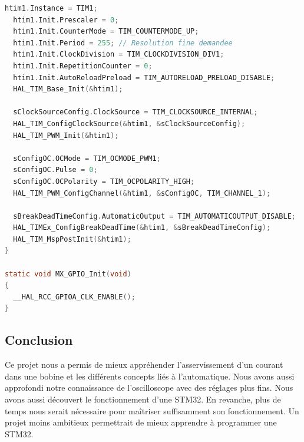 \documentclass[11pt]{report}
\begin{document}
\begin{lstlisting}[language=C, caption={fichier main.c en BO}, label={code:main_final}]
  htim1.Instance = TIM1;
  htim1.Init.Prescaler = 0;
  htim1.Init.CounterMode = TIM_COUNTERMODE_UP;
  htim1.Init.Period = 255; // Resolution fine demandee
  htim1.Init.ClockDivision = TIM_CLOCKDIVISION_DIV1;
  htim1.Init.RepetitionCounter = 0;
  htim1.Init.AutoReloadPreload = TIM_AUTORELOAD_PRELOAD_DISABLE;
  HAL_TIM_Base_Init(&htim1);

  sClockSourceConfig.ClockSource = TIM_CLOCKSOURCE_INTERNAL;
  HAL_TIM_ConfigClockSource(&htim1, &sClockSourceConfig);
  HAL_TIM_PWM_Init(&htim1);

  sConfigOC.OCMode = TIM_OCMODE_PWM1;
  sConfigOC.Pulse = 0;
  sConfigOC.OCPolarity = TIM_OCPOLARITY_HIGH;
  HAL_TIM_PWM_ConfigChannel(&htim1, &sConfigOC, TIM_CHANNEL_1);

  sBreakDeadTimeConfig.AutomaticOutput = TIM_AUTOMATICOUTPUT_DISABLE;
  HAL_TIMEx_ConfigBreakDeadTime(&htim1, &sBreakDeadTimeConfig);
  HAL_TIM_MspPostInit(&htim1);
}

static void MX_GPIO_Init(void)
{
  __HAL_RCC_GPIOA_CLK_ENABLE();
}
\end{lstlisting}

\subsection{Conclusion}
Ce projet nous a permis de mieux appréhender l'asservissement d'un courant dans une bobine et les différents concepts liés à l'automatique. Nous avons aussi approfondi notre connaissance de l'oscilloscope avec des réglages plus fins. Nous avons aussi découvert le fonctionnement d'une STM32. En revanche, plus de temps nous serait nécessaire pour maîtriser suffisamment son fonctionnement. Un projet moins ambitieux permettrait de mieux apprendre à programmer une STM32.
\end{document}

